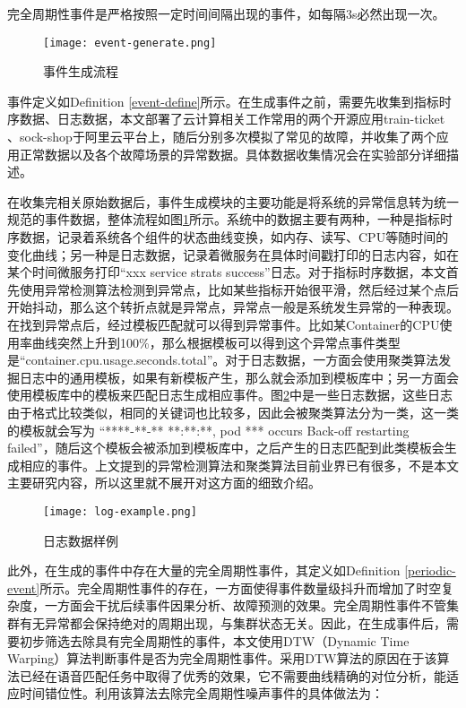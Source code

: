 \begin{definition}[完全周期性事件]
    \label{periodic-event}
    完全周期性事件是严格按照一定时间间隔出现的事件，如每隔3s必然出现一次。
\end{definition}

\begin{figure}[htbp]
    \centering
    \texttt{[image: event-generate.png]}
    \caption{事件生成流程\label{event-generate}}
\end{figure}

事件定义如Definition \ref{event-define}所示。在生成事件之前，需要先收集到指标时序数据、日志数据，本文部署了云计算相关工作常用的两个开源应用train-ticket\cite{zhou2018poster} 、sock-shop\cite{rahman2019predicting}于阿里云平台上，随后分别多次模拟了常见的故障，并收集了两个应用正常数据以及各个故障场景的异常数据。具体数据收集情况会在实验部分详细描述。

在收集完相关原始数据后，事件生成模块的主要功能是将系统的异常信息转为统一规范的事件数据，整体流程如图\ref{event-generate}所示。系统中的数据主要有两种，一种是指标时序数据，记录着系统各个组件的状态曲线变换，如内存、读写、CPU等随时间的变化曲线；另一种是日志数据，记录着微服务在具体时间戳打印的日志内容，如在某个时间微服务打印“xxx service strats success”日志。对于指标时序数据，本文首先使用异常检测算法检测到异常点，比如某些指标开始很平滑，然后经过某个点后开始抖动，那么这个转折点就是异常点，异常点一般是系统发生异常的一种表现。在找到异常点后，经过模板匹配就可以得到异常事件。比如某Container的CPU使用率曲线突然上升到100\%，那么根据模板可以得到这个异常点事件类型是“container.cpu.usage.seconds.total”。对于日志数据，一方面会使用聚类算法发掘日志中的通用模板，如果有新模板产生，那么就会添加到模板库中；另一方面会使用模板库中的模板来匹配日志生成相应事件。图\ref{log-example}中是一些日志数据，这些日志由于格式比较类似，相同的关键词也比较多，因此会被聚类算法分为一类，这一类的模板就会写为 “****-**-** **:**:**, pod *** occurs Back-off restarting failed”，随后这个模板会被添加到模板库中，之后产生的日志匹配到此类模板会生成相应的事件。上文提到的异常检测算法\cite{yang2019integrated}和聚类算法\cite{landauer2020system}目前业界已有很多，不是本文主要研究内容，所以这里就不展开对这方面的细致介绍。

\begin{figure}[htbp]
    \centering
    \texttt{[image: log-example.png]}
    \caption{日志数据样例\label{log-example}}
\end{figure}
此外，在生成的事件中存在大量的完全周期性事件，其定义如Definition \ref{periodic-event}所示。完全周期性事件的存在，一方面使得事件数量级抖升而增加了时空复杂度，一方面会干扰后续事件因果分析、故障预测的效果。完全周期性事件不管集群有无异常都会保持绝对的周期出现，与集群状态无关。因此，在生成事件后，需要初步筛选去除具有完全周期性的事件，本文使用DTW（Dynamic Time Warping）算法\cite{mueen2016extracting}判断事件是否为完全周期性事件。采用DTW算法的原因在于该算法已经在语音匹配任务中取得了优秀的效果，它不需要曲线精确的对位分析，能适应时间错位性。利用该算法去除完全周期性噪声事件的具体做法为：

